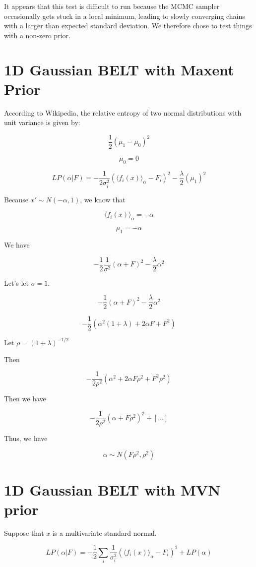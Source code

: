 \documentclass[12pt]{article}
\begin{document}
It appears that this test is difficult to run because the MCMC sampler occasionally gets stuck in a local minimum, leading to slowly converging chains with a larger than expected standard deviation.  We therefore chose to test things with a non-zero prior.

\section{1D Gaussian BELT with Maxent Prior}

According to Wikipedia, the relative entropy of two normal distributions with unit variance is given by:

$$\frac{1}{2} (\mu_1 - \mu_0)^2$$

$$\mu_0 = 0$$

$$LP(\alpha|F) = -\frac{1}{2\sigma_i^2}(\langle f_i(x)\rangle _\alpha - F_i)^2 - \frac{\lambda}{2} (\mu_1)^2$$

Because $x' \sim N(-\alpha, 1)$, we know that

$$\langle f_i(x)\rangle _\alpha = -\alpha$$

$$\mu_1 = -\alpha$$

We have

$$-\frac{1}{2} \frac{1}{\sigma^2} (\alpha + F)^2 - \frac{\lambda}{2} \alpha^2$$

Let's let $\sigma = 1$.  

$$-\frac{1}{2} (\alpha + F)^2 - \frac{\lambda}{2} \alpha^2$$

$$-\frac{1}{2}( \alpha^2 (1 + \lambda) + 2 \alpha F + F^2)$$

Let $\rho = (1 + \lambda)^{-1 / 2}$

Then 

$$-\frac{1}{2 \rho^2} (\alpha^2 + 2 \alpha F \rho^2 + F^2 \rho^2)$$

Then we have

$$-\frac{1}{2 \rho^2} (\alpha + F \rho^2)^2 + [...]$$

Thus, we have 

$$\alpha \sim N(F\rho^2, \rho^2)$$

\section{1D Gaussian BELT with MVN prior}

Suppose that $x$ is a multivariate standard normal.  

$$LP(\alpha|F) = -\frac{1}{2} \sum_i \frac{1}{\sigma_i^2}(\langle f_i(x)\rangle _\alpha - F_i)^2 + LP(\alpha)$$
\end{document}
